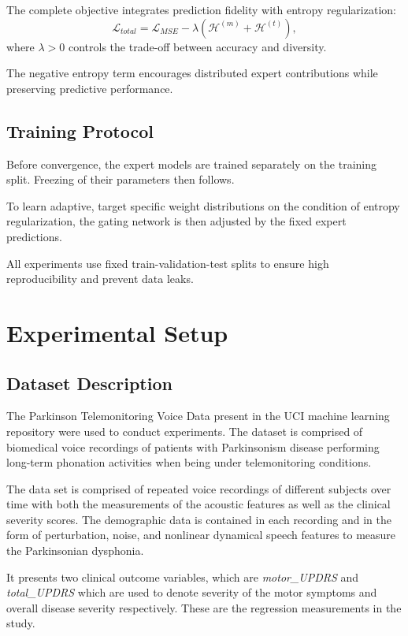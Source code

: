 \documentclass{customIEEEsingle}
\begin{document}
	The complete objective integrates prediction fidelity with entropy regularization:
	\begin{equation}
		\mathcal{L}_{total}
		=
		\mathcal{L}_{MSE}
		-
		\lambda
		\left(
		\mathcal{H}^{(m)} + \mathcal{H}^{(t)}
		\right),
	\end{equation}
	where $\lambda > 0$ controls the trade-off between accuracy and diversity.
	
	The negative entropy term encourages distributed expert contributions while preserving predictive performance.
	\subsection{Training Protocol}
	
	
	Before convergence, the expert models are trained separately on the training split. Freezing of their parameters then follows.
	
	To learn adaptive, target specific weight distributions on the condition of entropy regularization, the gating network is then adjusted by the fixed expert predictions.
	
	All experiments use fixed train-validation-test splits to ensure high reproducibility and prevent data leaks.
	
	\section{Experimental Setup}\label{sec:experiments}
	\subsection{Dataset Description}
	
	The Parkinson Telemonitoring Voice Data present in the UCI machine learning repository \cite{parkinsons_telemonitoring_189} were used to conduct experiments. The dataset is comprised of biomedical voice recordings of patients with Parkinsonism disease performing long-term phonation activities when being under telemonitoring conditions.
	
	The data set is comprised of repeated voice recordings of different subjects over time with both the measurements of the acoustic features as well as the clinical severity scores. The demographic data is contained in each recording and in the form of perturbation, noise, and nonlinear dynamical speech features to measure the Parkinsonian dysphonia.
	
	It presents two clinical outcome variables, which are \textit{motor\_UPDRS} and \textit{total\_UPDRS} which are used to denote severity of the motor symptoms and overall disease severity respectively. These are the regression measurements in the study.
	
\end{document}
